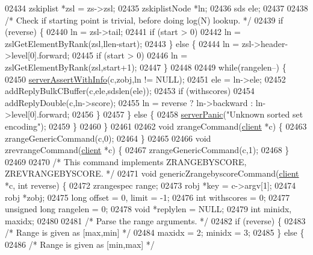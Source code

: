 \begin{DoxyCode}
02434         zskiplist *zsl = zs->zsl;
02435         zskiplistNode *ln;
02436         sds ele;
02437 
02438         \textcolor{comment}{/* Check if starting point is trivial, before doing log(N) lookup. */}
02439         \textcolor{keywordflow}{if} (reverse) \{
02440             ln = zsl->tail;
02441             \textcolor{keywordflow}{if} (start > 0)
02442                 ln = zslGetElementByRank(zsl,llen-start);
02443         \} \textcolor{keywordflow}{else} \{
02444             ln = zsl->header->level[0].forward;
02445             \textcolor{keywordflow}{if} (start > 0)
02446                 ln = zslGetElementByRank(zsl,start+1);
02447         \}
02448 
02449         \textcolor{keywordflow}{while}(rangelen--) \{
02450             \hyperlink{server_8h_a7308f76cbff9a8d3797fe78190b91282}{serverAssertWithInfo}(c,zobj,ln != NULL);
02451             ele = ln->ele;
02452             addReplyBulkCBuffer(c,ele,sdslen(ele));
02453             \textcolor{keywordflow}{if} (withscores)
02454                 addReplyDouble(c,ln->score);
02455             ln = reverse ? ln->backward : ln->level[0].forward;
02456         \}
02457     \} \textcolor{keywordflow}{else} \{
02458         \hyperlink{server_8h_a11cc378e7778a830b41240578de3b204}{serverPanic}(\textcolor{stringliteral}{"Unknown sorted set encoding"});
02459     \}
02460 \}
02461 
02462 \textcolor{keywordtype}{void} zrangeCommand(\hyperlink{structclient}{client} *c) \{
02463     zrangeGenericCommand(c,0);
02464 \}
02465 
02466 \textcolor{keywordtype}{void} zrevrangeCommand(\hyperlink{structclient}{client} *c) \{
02467     zrangeGenericCommand(c,1);
02468 \}
02469 
02470 \textcolor{comment}{/* This command implements ZRANGEBYSCORE, ZREVRANGEBYSCORE. */}
02471 \textcolor{keywordtype}{void} genericZrangebyscoreCommand(\hyperlink{structclient}{client} *c, \textcolor{keywordtype}{int} reverse) \{
02472     zrangespec range;
02473     robj *key = c->argv[1];
02474     robj *zobj;
02475     \textcolor{keywordtype}{long} offset = 0, limit = -1;
02476     \textcolor{keywordtype}{int} withscores = 0;
02477     \textcolor{keywordtype}{unsigned} \textcolor{keywordtype}{long} rangelen = 0;
02478     \textcolor{keywordtype}{void} *replylen = NULL;
02479     \textcolor{keywordtype}{int} minidx, maxidx;
02480 
02481     \textcolor{comment}{/* Parse the range arguments. */}
02482     \textcolor{keywordflow}{if} (reverse) \{
02483         \textcolor{comment}{/* Range is given as [max,min] */}
02484         maxidx = 2; minidx = 3;
02485     \} \textcolor{keywordflow}{else} \{
02486         \textcolor{comment}{/* Range is given as [min,max] */}

\end{DoxyCode}
